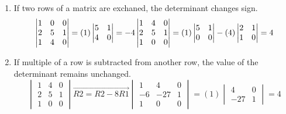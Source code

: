 \documentclass[../main.tex]{subfiles}
\begin{document}
\begin{example}
\begin{enumerate}
    \item If two rows of a matrix are exchaned, the determinant changes sign.
    \begin{equation*}
      \begin{vmatrix}
        1 & 0 & 0\\
        2 & 5 & 1\\
        1 & 4 & 0
      \end{vmatrix}
      =(1)
      \begin{vmatrix}
        5 & 1\\
        4 & 0
      \end{vmatrix}
      =-4\\
      \begin{vmatrix}
        1 & 4 & 0\\
        2 & 5 & 1\\
        1 & 0 & 0
      \end{vmatrix}
      =(1)
      \begin{vmatrix}
        5 & 1\\
        0 & 0
      \end{vmatrix}
      -(4)
      \begin{vmatrix}
        2 & 1\\
        1 & 0
      \end{vmatrix}
      =4
    \end{equation*}
    
    \item If multiple of a row is subtracted from another row, the value of the determinant remains unchanged.
    \begin{equation*}
      \begin{vmatrix}
        1 & 4 & 0\\
        2 & 5 & 1\\
        1 & 0 & 0
      \end{vmatrix}
      \overrightarrow{R2 = R2-8R1}
      \begin{vmatrix}
        1 & 4 & 0\\
        -6 & -27 & 1\\
        1 & 0 & 0
      \end{vmatrix}
      =(1)
      \begin{vmatrix}
        4 & 0\\
        -27 & 1
      \end{vmatrix}
      =4
    \end{equation*}
    
  \end{enumerate}
\end{example}
\end{document}

